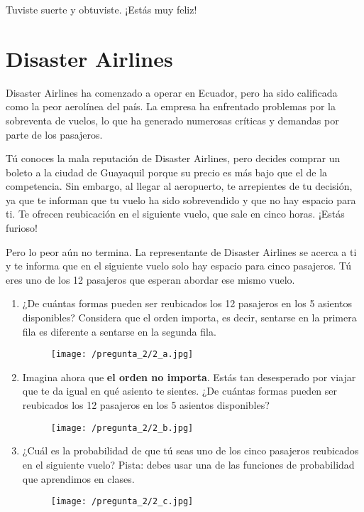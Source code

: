 \documentclass[a4paper]{article}
\begin{document}
Tuviste suerte y obtuviste. ¡Estás muy feliz!

\newpage

\section*{Disaster Airlines}

Disaster Airlines ha comenzado a operar en Ecuador, pero ha sido calificada como la peor aerolínea del país.
La empresa ha enfrentado problemas por la sobreventa de vuelos, lo que ha generado numerosas críticas y demandas por parte de los pasajeros.

Tú conoces la mala reputación de Disaster Airlines, pero decides comprar un boleto a la ciudad de Guayaquil porque su precio es más bajo que el de la competencia. Sin embargo, al llegar al aeropuerto, te arrepientes de tu decisión, ya que te informan que tu vuelo ha sido sobrevendido y que no hay espacio para ti. Te ofrecen reubicación en el siguiente vuelo, que sale en cinco horas. ¡Estás furioso!

Pero lo peor aún no termina. La representante de Disaster Airlines se acerca a ti y te informa que en el siguiente vuelo solo hay espacio para cinco pasajeros. Tú eres uno de los 12 pasajeros que esperan abordar
ese mismo vuelo.

\begin{enumerate}[label=\alph*.]
	\item ¿De cuántas formas pueden ser reubicados los 12 pasajeros en los 5 asientos disponibles? Considera que el orden importa, es decir, sentarse en la primera fila es diferente a sentarse en la segunda fila.
		\begin{figure}[H]
		\centering
		\texttt{[image: /pregunta\_2/2\_a.jpg]}
		\end{figure}
	\item Imagina ahora que \textbf{el orden no importa}. Estás tan desesperado por viajar que te da igual en qué asiento te sientes. ¿De cuántas formas pueden ser reubicados los 12 pasajeros en los 5 asientos
	disponibles?
		\begin{figure}[H]
		\centering
		\texttt{[image: /pregunta\_2/2\_b.jpg]}
		\end{figure}
	\item ¿Cuál es la probabilidad de que tú seas uno de los cinco pasajeros reubicados en el siguiente vuelo?
	Pista: debes usar una de las funciones de probabilidad que aprendimos en clases.
		\begin{figure}[H]
		\centering
		\texttt{[image: /pregunta\_2/2\_c.jpg]}
		\end{figure}
\end{enumerate}
\end{document}
